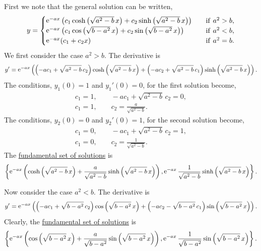 \begin{Solution}
  \label{solution fund set y+2ay+by}
  First we note that the general solution can be written,
  \[
  y = 
  \begin{cases}
    \mathop{\mathrm{e}}\nolimits^{-a x} \left( c_1 \cosh \left( \sqrt{a^2 - b}\, x \right) 
      + c_2 \sinh \left( \sqrt{a^2 - b}\, x \right) \right)
    \quad &\mathrm{if}\ a^2 > b, \\
    \mathop{\mathrm{e}}\nolimits^{-a x} \left( c_1 \cos \left( \sqrt{b - a^2}\,x \right) 
      + c_2 \sin \left( \sqrt{b-a^2}\, x \right) \right)
    \quad &\mathrm{if}\ a^2 < b, \\
    \mathop{\mathrm{e}}\nolimits^{-a x} ( c_1 + c_2 x ) 
    \quad &\mathrm{if}\ a^2 = b. 
  \end{cases}
  \]
  We first consider the case $a^2 > b$.  The derivative is
  \[
  y' = 
  \mathop{\mathrm{e}}\nolimits^{-a x} \left( \left( -a c_1 + \sqrt{a^2 - b}\, c_2 \right) 
    \cosh \left( \sqrt{a^2 - b}\, x \right) 
    + \left( -a c_2 + \sqrt{a^2 - b}\, c_1 \right) 
    \sinh \left( \sqrt{a^2 - b}\, x \right) \right).
  \]
  The conditions, $y_1(0) = 1$ and $y_1'(0) = 0$, for the first solution become,
  \begin{gather*}
    c_1 = 1, \qquad -a c_1 + \sqrt{a^2 - b}\, c_2 = 0, \\
    c_1 = 1, \qquad c_2 = \frac{a}{\sqrt{a^2-b}}.
  \end{gather*}
  The conditions, $y_2(0) = 0$ and $y_2'(0) = 1$, for the second solution become,
  \begin{gather*}
    c_1 = 0, \qquad -a c_1 + \sqrt{a^2 - b}\, c_2 = 1, \\
    c_1 = 0, \qquad c_2 = \frac{1}{\sqrt{a^2-b}}.
  \end{gather*}
  The 
  \hyperref[section The Fundamental Set of Solutions]
    {fundamental set of solutions}
  is
  \[
  \left\{
    \mathop{\mathrm{e}}\nolimits^{-a x} \left( \cosh \left( \sqrt{a^2 - b}\, x \right) 
      + \frac{a}{\sqrt{a^2-b}} \sinh \left( \sqrt{a^2 - b}\, x \right) 
    \right),
    \mathop{\mathrm{e}}\nolimits^{-a x} \frac{1}{\sqrt{a^2-b}} \sinh \left( \sqrt{a^2 - b}\, x \right)
  \right\}.
  \]

  Now consider the case $a^2 < b$.  The derivative is
  \[
  y' = 
  \mathop{\mathrm{e}}\nolimits^{-a x} \left( \left( -a c_1 + \sqrt{b - a^2}\, c_2 \right) 
    \cos \left( \sqrt{b - a^2}\, x \right) 
    + \left( -a c_2 - \sqrt{b - a^2}\, c_1 \right) 
    \sin \left( \sqrt{b - a^2}\, x \right) \right).
  \]
  Clearly, the 
  \hyperref[section The Fundamental Set of Solutions]
    {fundamental set of solutions}
  is
  \[
  \left\{
    \mathop{\mathrm{e}}\nolimits^{-a x} \left( \cos \left( \sqrt{b - a^2}\, x \right) 
      + \frac{a}{\sqrt{b - a^2}} \sin \left( \sqrt{b - a^2}\, x \right) \right),
    \mathop{\mathrm{e}}\nolimits^{-a x} \frac{1}{\sqrt{b - a^2}} \sin \left( \sqrt{b - a^2}\, x \right)
  \right\}.
  \]


\end{Solution}
